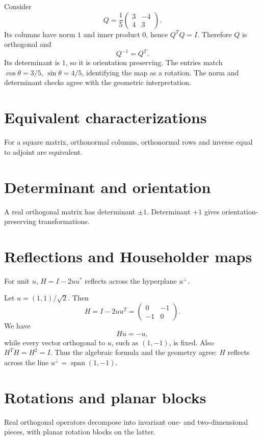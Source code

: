 \begin{example}\label{ex:i15-expand-01}
Consider
\[
Q=\frac15\begin{pmatrix}3&-4\\4&3\end{pmatrix}.
\]
Its columns have norm \(1\) and inner product \(0\), hence
\(Q^TQ=I\). Therefore \(Q\) is orthogonal and
\[
Q^{-1}=Q^T.
\]
Its determinant is \(1\), so it is orientation preserving. The entries match
\(\cos\theta=3/5\), \(\sin\theta=4/5\), identifying the map as a rotation.
The norm and determinant checks agree with the geometric interpretation.
\end{example}
\section{Equivalent characterizations}
For a square matrix, orthonormal columns, orthonormal rows and inverse equal to adjoint are equivalent.

\section{Determinant and orientation}
A real orthogonal matrix has determinant $\pm1$. Determinant $+1$ gives orientation-preserving transformations.

\section{Reflections and Householder maps}
For unit $u$, $H=I-2uu^*$ reflects across the hyperplane $u^\perp$.


\begin{example}\label{ex:i15-expand-02}
Let \(u=(1,1)/\sqrt2\). Then
\[
H=I-2uu^T
=\begin{pmatrix}0&-1\\-1&0\end{pmatrix}.
\]
We have
\[
Hu=-u,
\]
while every vector orthogonal to \(u\), such as \((1,-1)\), is fixed.
Also \(H^T H=H^2=I\). Thus the algebraic formula and the geometry agree:
\(H\) reflects across the line \(u^\perp=\operatorname{span}(1,-1)\).
\end{example}
\section{Rotations and planar blocks}
Real orthogonal operators decompose into invariant one- and two-dimensional pieces, with planar rotation blocks on the latter.



